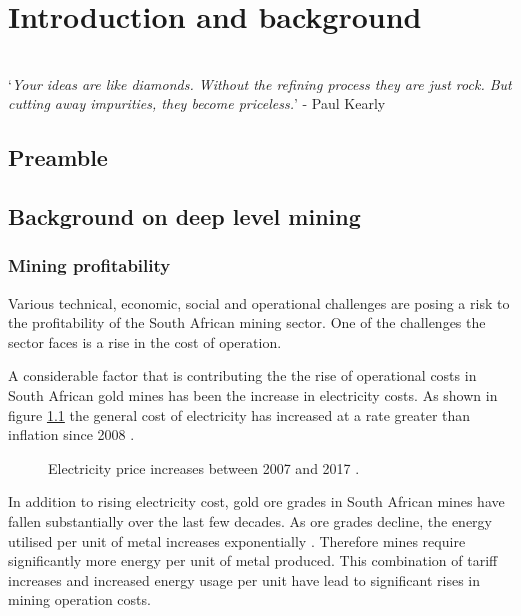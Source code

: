 \chapter{Introduction and background}  %
\setcounter{page}{1}
\vspace{38em}

\hrulefill
\\
\enquote*{\textit{Your ideas are like diamonds. Without the refining process they are just rock. But cutting away impurities, they become priceless.}} - Paul Kearly\\
\newpage


\section{Preamble}

\section{Background on deep level mining}

\subsection{Mining profitability}
 Various technical, economic, social and operational challenges are posing a risk to the profitability of the South African mining sector. One of the challenges the sector faces  is a rise in the cost of operation\cite{neingo2016trends}.\par
A considerable factor that is contributing the the rise of operational costs in South African gold mines has been the increase in electricity costs. As shown in figure \ref{fig: Eskom tariffs} the general cost of electricity has increased at a rate greater than inflation since 2008 \cite{Eskom2013Tariffs}.
\begin{figure}[h]
	\centering
	\fbox{}
	\caption[Electricity price increases between 2007 and 2017.]{Electricity price increases between 2007 and 2017 \cite{Eskom2013Tariffs,Inflation2013}.}
	\label{fig: Eskom tariffs}
\end{figure}
\par
In addition to rising electricity cost, gold ore grades in South African mines have fallen substantially over the last few decades\cite{mudd2007global}. As ore grades decline, the energy utilised per unit of metal increases exponentially \cite{muller2010numerical}. Therefore mines require significantly more energy per unit of metal produced. This combination of tariff increases and increased energy usage per unit  have lead to significant rises in mining operation costs. \par

